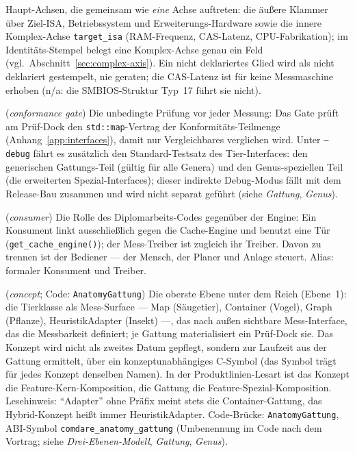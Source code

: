 \begin{description}
  Haupt-Achsen, die gemeinsam wie \emph{eine} Achse auftreten: die äußere Klammer über Ziel-ISA,
  Betriebssystem und Erweiterungs-Hardware sowie die innere Komplex-Achse \texttt{target\_isa}
  (RAM-Frequenz, CAS-Latenz, CPU-Fabrikation); im Identitäts-Stempel belegt eine Komplex-Achse
  genau ein Feld (vgl.\ Abschnitt~\ref{sec:complex-axis}). Ein nicht deklariertes Glied wird als
  nicht deklariert gestempelt, nie geraten; die CAS-Latenz ist für keine Messmaschine erhoben (n/a:
  die SMBIOS-Struktur Typ~17 führt sie nicht).
  \item[Konformitäts-Gate] (\emph{conformance gate}) Die unbedingte Prüfung vor jeder Messung: Das
  Gate prüft am Prüf-Dock den \texttt{std::map}-Vertrag der Konformitäts-Teilmenge
  (Anhang~\ref{app:interfaces}), damit nur Vergleichbares verglichen wird. Unter \texttt{--debug}
  fährt es zusätzlich den Standard-Testsatz des Tier-Interfaces: den generischen Gattungs-Teil
  (gültig für alle Genera) und den Genus-speziellen Teil (die erweiterten Spezial-Interfaces); dieser
  indirekte Debug-Modus fällt mit dem Release-Bau zusammen und wird nicht separat geführt (siehe
  \emph{Gattung}, \emph{Genus}).
  \item[Konsument] (\emph{consumer}) Die Rolle des Diplomarbeits-Codes gegenüber der Engine: Ein
  Konsument linkt ausschließlich gegen die Cache-Engine und benutzt eine Tür
  (\texttt{get\_cache\_engine()}); der Mess-Treiber ist zugleich ihr Treiber. Davon zu trennen ist
  der Bediener --- der Mensch, der Planer und Anlage steuert. Alias: formaler Konsument und Treiber.
  \item[Konzept] (\emph{concept}; Code: \texttt{AnatomyGattung}) Die oberste Ebene unter dem Reich
  (Ebene~1): die Tierklasse als Mess-Surface --- Map (Säugetier), Container (Vogel), Graph (Pflanze),
  HeuristikAdapter (Insekt) ---, das nach außen sichtbare Mess-Interface, das die Messbarkeit
  definiert; je Gattung materialisiert ein Prüf-Dock sie. Das Konzept wird nicht als zweites Datum
  gepflegt, sondern zur Laufzeit aus der Gattung ermittelt, über ein konzeptunabhängiges C-Symbol
  (das Symbol trägt für jedes Konzept denselben Namen). In der Produktlinien-Lesart ist das Konzept
  die Feature-Kern-Komposition, die Gattung die Feature-Spezial-Komposition. Lesehinweis:
  \enquote{Adapter} ohne Präfix meint stets die Container-Gattung, das Hybrid-Konzept heißt immer
  HeuristikAdapter. Code-Brücke: \texttt{AnatomyGattung}, ABI-Symbol
  \texttt{comdare\_anatomy\_gattung} (Umbenennung im Code nach dem Vortrag; siehe
  \emph{Drei-Ebenen-Modell}, \emph{Gattung}, \emph{Genus}).

\end{description}
